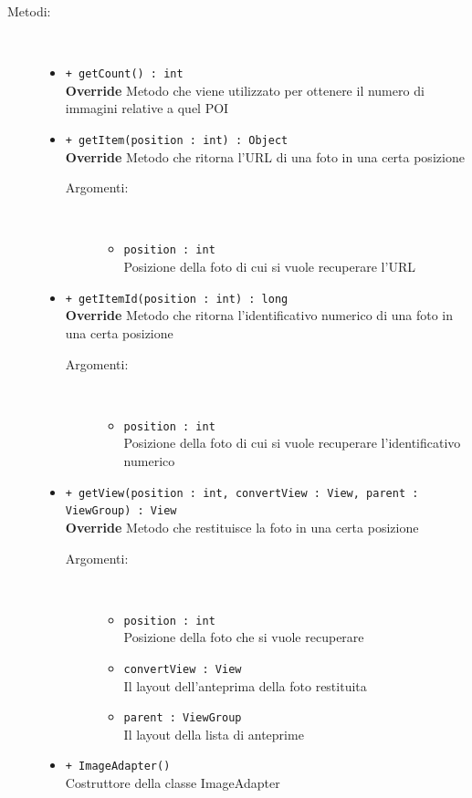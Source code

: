 \documentclass[../DefinizioneDiProdotto.tex]{subfiles}
\begin{document}
\begin{description}
\begin{itemize}
\end{itemize}
\item[Metodi:] \
\begin{itemize}
\item \texttt{+ getCount() : int}\\
\textbf{Override} Metodo che viene utilizzato per ottenere il numero di immagini relative a quel POI
 \item \texttt{+ getItem(position : int) : Object}\\
\textbf{Override} Metodo che ritorna l'URL di una foto in una certa posizione
 \begin{description}
\item[Argomenti:] \
\begin{itemize}
\item \texttt{position : int}\\
Posizione della foto di cui si vuole recuperare l'URL\end{itemize}
\end{description}
\item \texttt{+ getItemId(position  : int) : long}\\
\textbf{Override} Metodo che ritorna l'identificativo numerico di una foto in una certa posizione
 \begin{description}
\item[Argomenti:] \
\begin{itemize}
\item \texttt{position  : int}\\
Posizione della foto di cui si vuole recuperare l'identificativo numerico\end{itemize}
\end{description}
\item \texttt{+ getView(position  : int, convertView : View, parent : ViewGroup) : View}\\
\textbf{Override} Metodo che restituisce la foto in una certa posizione
 \begin{description}
\item[Argomenti:] \
\begin{itemize}
\item \texttt{position  : int}\\
Posizione della foto che si vuole recuperare\item \texttt{convertView : View}\\
Il layout dell'anteprima della foto restituita\item \texttt{parent : ViewGroup}\\
Il layout della lista di anteprime\end{itemize}
\end{description}
\item \texttt{+ ImageAdapter()}\\
Costruttore della classe ImageAdapter
 \end{itemize}
\end{description}
\end{document}
